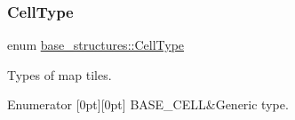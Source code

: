 \subsubsection{\texorpdfstring{Cell\+Type}{CellType}}
{\footnotesize\ttfamily enum \hyperlink{group__map__interface_ga7a79b122dbd494c4eea32680c5df34c1}{base\+\_\+structures\+::\+Cell\+Type}}



Types of map tiles. 

\begin{DoxyEnumFields}{Enumerator}
[0pt][0pt]{}\mbox{\label{group__map__interface_gga7a79b122dbd494c4eea32680c5df34c1a27c590e53e5b28bde1d1b9cfb8a18cd5}} 
B\+A\+S\+E\+\_\+\+C\+E\+LL&Generic type. \\
\hline

\end{DoxyEnumFields}
